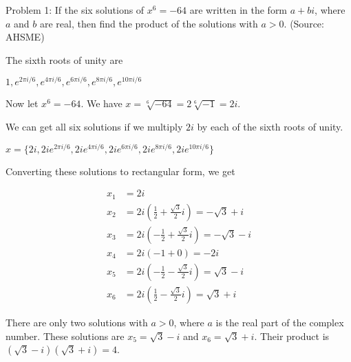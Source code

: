 Problem 1: If the six solutions of $x^6 = -64$ are written in the form $a + bi$, where $a$ and $b$ are real, then find the product of the solutions with $a > 0$. (Source: AHSME)

The sixth roots of unity are

$1, e^{2\pi i / 6}, e^{4 \pi i / 6}, e^{6 \pi i / 6}, e^{8 \pi i / 6}, e^{10 \pi i / 6}$

Now let $x^6 = -64$. We have $x = \sqrt[6]{-64} = 2\sqrt[6]{-1} = 2i$. 

We can get all six solutions if we multiply $2i$ by each of the sixth roots of unity.

$x = \{ 2i, 2i e^{2\pi i / 6}, 2i e^{4 \pi i / 6}, 2i e^{6 \pi i / 6}, 2i e^{8 \pi i / 6}, 2i e^{10 \pi i / 6} \}$

Converting these solutions to rectangular form, we get

\begin{align*}
x_1 &= 2i \\
x_2 &= 2i(\frac{1}{2} + \frac{\sqrt 3}{2}i) = -\sqrt{3} + i \\
x_3 &= 2i(-\frac{1}{2} + \frac{\sqrt 3}{2}i) = -\sqrt{3} - i \\
x_4 &= 2i(-1 + 0) = -2i \\
x_5 &= 2i(-\frac{1}{2} - \frac{\sqrt 3}{2}i) = \sqrt{3} - i \\
x_6 &= 2i(\frac{1}{2} - \frac{\sqrt 3}{2}i) = \sqrt{3} + i
\end{align*}

There are only two solutions with $a > 0$, where $a$ is the real part of the complex number. These solutions are $x_5 = \sqrt{3} - i$ and $x_6 = \sqrt{3} + i$. Their product is $\boxed{(\sqrt{3} - i)(\sqrt{3} + i) = 4}$.
